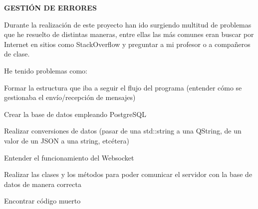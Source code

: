 {\bfseries G\+E\+S\+T\+IÓN DE E\+R\+R\+O\+R\+ES}

Durante la realización de este proyecto han ido surgiendo multitud de problemas que he resuelto de distintas maneras, entre ellas las más comunes eran buscar por Internet en sitios como Stack\+Overflow y preguntar a mi profesor o a compañeros de clase.

He tenido problemas como\+:
\begin{DoxyItemize}
\item Formar la estructura que iba a seguir el flujo del programa (entender cómo se gestionaba el envío/recepción de mensajes)
\item Crear la base de datos empleando Postgre\+S\+QL
\item Realizar conversiones de datos (pasar de una std\+::string a una Q\+String, de un valor de un J\+S\+ON a una string, etcétera)
\item Entender el funcionamiento del Websocket
\item Realizar las clases y los métodos para poder comunicar el servidor con la base de datos de manera correcta
\item Encontrar código muerto 
\end{DoxyItemize}